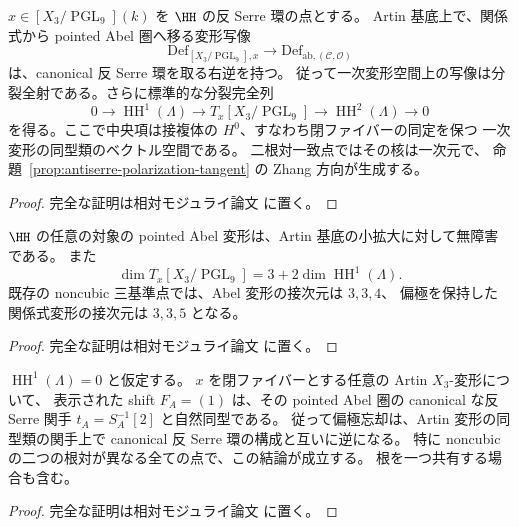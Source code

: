 \begin{corollary}[形式的な偏極忘却の分裂]
\label{cor:artin-polarization-retraction}
$x\in[X_3/\operatorname{PGL}_9](k)$ を $\HH$ の反 Serre 環の点とする。
Artin 基底上で、関係式から pointed Abel 圏へ移る変形写像
\[
 \mathrm{Def}_{[X_3/\operatorname{PGL}_9],x}
 \longrightarrow\mathrm{Def}_{\mathrm{ab},(\mathcal C,\mathcal O)}
\]
は、canonical 反 Serre 環を取る右逆を持つ。
従って一次変形空間上の写像は分裂全射である。さらに標準的な分裂完全列
\[
 0\longrightarrow\operatorname{HH}^{1}(\Lambda)
 \longrightarrow T_x[X_3/\operatorname{PGL}_9]
 \longrightarrow\operatorname{HH}^{2}(\Lambda)
 \longrightarrow0
 \tag{Artin-pol}\label{eq:artin-polarization-tangent-split}
\]
を得る。ここで中央項は接複体の $H^0$、すなわち閉ファイバーの同定を保つ
一次変形の同型類のベクトル空間である。
二根対一致点ではその核は一次元で、
命題~\ref{prop:antiserre-polarization-tangent} の Zhang 方向が生成する。
\end{corollary}
\begin{proof}
完全な証明は相対モジュライ論文 \cite[\texttt{artin_foundation}]{QuadricModuli2026} に置く。
\end{proof}

\begin{corollary}
\label{cor:artin-abelian-unobstructed}
$\HH$ の任意の対象の pointed Abel 変形は、Artin 基底の小拡大に対して無障害である。
また
\[
 \dim T_x[X_3/\operatorname{PGL}_9]
 =3+2\dim\operatorname{HH}^{1}(\Lambda).
\]
既存の noncubic 三基準点では、Abel 変形の接次元は $3,3,4$、
偏極を保持した関係式変形の接次元は $3,3,5$ となる。
\end{corollary}
\begin{proof}
完全な証明は相対モジュライ論文 \cite[\texttt{artin_foundation}]{QuadricModuli2026} に置く。
\end{proof}

\begin{corollary}[$\operatorname{HH}^{1}=0$ の点での全 Artin 偏極認識]
\label{cor:artin-rigid-polarization}
$\operatorname{HH}^{1}(\Lambda)=0$ と仮定する。
$x$ を閉ファイバーとする任意の Artin $X_3$-変形について、
表示された shift $F_A=(1)$ は、その pointed Abel 圏の canonical な反 Serre 関手
$t_A=S_A^{-1}[2]$ と自然同型である。
従って偏極忘却は、Artin 変形の同型類の関手上で canonical 反 Serre 環の構成と互いに逆になる。
特に noncubic の二つの根対が異なる全ての点で、この結論が成立する。
根を一つ共有する場合も含む。
\end{corollary}
\begin{proof}
完全な証明は相対モジュライ論文 \cite[\texttt{artin_foundation}]{QuadricModuli2026} に置く。
\end{proof}

